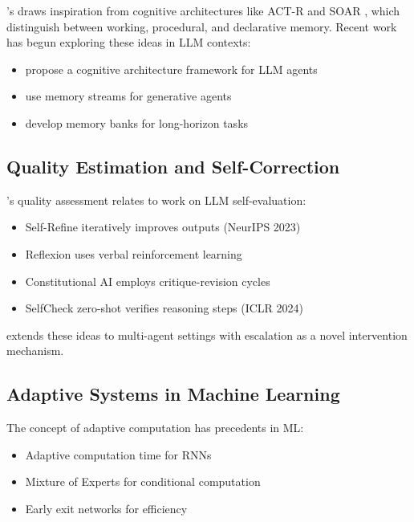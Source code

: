\documentclass{article}
\theoremstyle{plain}
\theoremstyle{definition}
\theoremstyle{remark}
\begin{document}
\amore{}'s \uma{} draws inspiration from cognitive architectures like ACT-R and SOAR \citep{laird2022analysis}, which distinguish between working, procedural, and declarative memory. Recent work has begun exploring these ideas in LLM contexts:

\begin{itemize}[nosep]
	\item \citet{sumers2023cognitive} propose a cognitive architecture framework for LLM agents
	\item \citet{park2023generative} use memory streams for generative agents
	\item \citet{zhong2024memorybank} develop memory banks for long-horizon tasks
\end{itemize}

\subsection{Quality Estimation and Self-Correction}

\rcm{}'s quality assessment relates to work on LLM self-evaluation:

\begin{itemize}[nosep]
	\item Self-Refine \citep{madaan2024selfrefine} iteratively improves outputs (NeurIPS 2023)
	\item Reflexion \citep{shinn2024reflexion} uses verbal reinforcement learning
	\item Constitutional AI \citep{bai2022constitutional} employs critique-revision cycles
	\item SelfCheck \citep{miao2023selfcheck} zero-shot verifies reasoning steps (ICLR 2024) 
\end{itemize}

\amore{} extends these ideas to multi-agent settings with escalation as a novel intervention mechanism.

\subsection{Adaptive Systems in Machine Learning}

The concept of adaptive computation has precedents in ML:

\begin{itemize}[nosep]
	\item Adaptive computation time \citep{kalinin2025analog} for RNNs
	\item Mixture of Experts \citep{pavlitska2025robust} for conditional computation
	\item Early exit networks \citep{simioni2025early} for efficiency 
\end{itemize}
\end{document}
